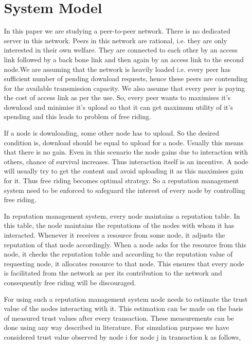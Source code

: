 \documentclass{IEEEtran}
\begin{document}
\section{System Model}
In this paper we are studying a peer-to-peer network. There is no dedicated server in this network. Peers in this network are rational, i.e. they are only interested in their own welfare. They are connected to each other by an access link followed by a back bone link and then again by an access link to the second node.We are assuming that the network is heavily loaded i.e. every peer has
sufficient number of pending download requests, hence these peers are contending for the available transmission capacity. We also assume that every peer is paying the cost of access link as per the use. So, every peer wants to maximises it's download and minimise it's upload so that it can get maximum utility of it's spending and this leads to problem of free riding.

If a node is downloading, some other node has to upload. So the desired condition is, download should be equal to upload for a node. Usually this means that there is no gain. Even in this scenario the node gains due to interaction with others, chance of survival increases. Thus interaction itself is an incentive. A node will usually try to get the content and avoid uploading it as this maximises gain for it. Thus free riding becomes optimal strategy. So a reputation management system need to be enforced to safeguard the interest of every node by controlling free riding.

In reputation management system, every node maintains a reputation table. In this table, the node maintains the reputations of the nodes with whom it has interacted. Whenever it receives a resource from some node, it adjusts the reputation of that node accordingly. When a node asks for the resource from this node, it checks the reputation table and according to the reputation value of requesting node, it allocates resource to that node. This ensures that every node is facilitated from the network as per its contribution to the network and consequently free riding will be discouraged.

For using such a reputation management system node needs to estimate the trust value of the nodes interacting with it. This estimation can be made on the basis of measured trust values  after every transaction. These measurements can be done using any way described in literature. For simulation purpose we have considered trust value observed by node i for node j in transaction k as follows,
\end{document}
